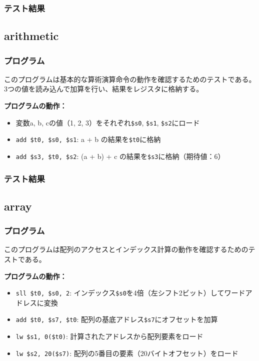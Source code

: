 \documentclass[dvipdfmx]{jsarticle}
\begin{document}
\subsubsection{テスト結果}


\subsection{arithmetic}
\label{appendix:arithmetic}

\subsubsection{プログラム}
このプログラムは基本的な算術演算命令の動作を確認するためのテストである。
3つの値を読み込んで加算を行い、結果をレジスタに格納する。



\textbf{プログラムの動作：}
\begin{itemize}
\item 変数a, b, cの値（1, 2, 3）をそれぞれ\texttt{\$s0}, \texttt{\$s1}, \texttt{\$s2}にロード
\item \texttt{add \$t0, \$s0, \$s1}: a + b の結果を\texttt{\$t0}に格納
\item \texttt{add \$s3, \$t0, \$s2}: (a + b) + c の結果を\texttt{\$s3}に格納（期待値：6）
\end{itemize}

\subsubsection{テスト結果}


\subsection{array}
\label{appendix:array}

\subsubsection{プログラム}
このプログラムは配列のアクセスとインデックス計算の動作を確認するためのテストである。



\textbf{プログラムの動作：}
\begin{itemize}
\item \texttt{sll \$t0, \$s0, 2}: インデックス\texttt{\$s0}を4倍（左シフト2ビット）してワードアドレスに変換
\item \texttt{add \$t0, \$s7, \$t0}: 配列の基底アドレス\texttt{\$s7}にオフセットを加算
\item \texttt{lw \$s1, 0(\$t0)}: 計算されたアドレスから配列要素をロード
\item \texttt{lw \$s2, 20(\$s7)}: 配列の5番目の要素（20バイトオフセット）をロード
\end{itemize}
\end{document}
